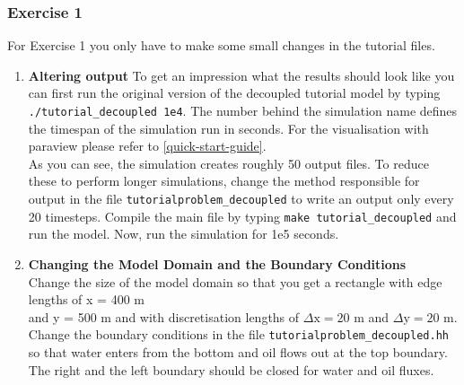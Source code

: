 \subsubsection{Exercise 1}
\renewcommand{\labelenumi}{\alph{enumi})}
For Exercise 1 you only have to make some small changes in the tutorial files.
\begin{enumerate}
\item \textbf{Altering output}
To get an impression what the results should look like you can first run the original version of the decoupled tutorial model by typing  \texttt{./tutorial\_decoupled 1e4}. The number behind the simulation name defines the timespan of the simulation run in seconds. For the visualisation with paraview please refer to \ref{quick-start-guide}.\\
As you can see, the simulation creates roughly 50 output files. To reduce these to perform longer simulations, change the method responsible for output in the file \texttt{tutorialproblem\_decoupled} to write an output only every 20 timesteps. Compile the main file by typing \texttt{make tutorial\_decoupled} and run the model. Now, run the simulation for 1e5 seconds.

\item \textbf{Changing the Model Domain and the Boundary Conditions} \\
Change the size of the model domain so that you get a rectangle
with edge lengths of x = 400 m \\  and y = 500 m and with discretisation lengths of  $\Delta \text{x} = 20$ m and $\Delta \text{y} = 20$ m. \\
Change the boundary conditions in the file \texttt{tutorialproblem\_decoupled.hh} so that water enters from the bottom and oil flows out at the top boundary. The right and the left boundary should be closed for water and oil fluxes.  \\


\end{enumerate}

